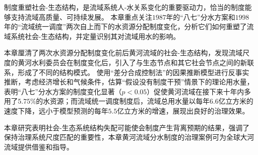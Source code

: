 制度重塑社会-生态结构，是流域系统人-水关系变化的重要驱动力，恰当的制度能够支持流域高质量、可持续发展。
本章重点关注$1987$年的“八七”分水方案和$1998$年的“流域统一调度”两次自上而下的水资源分配制度变化，分析它们如何重塑了流域系统社会-生态结构，并定量识别其对流域用水的影响。

本章厘清了两次水资源分配制度变化前后黄河流域的社会-生态结构，发现流域尺度的黄河水利委员会在制度变化后，引入了与生态节点和其它社会节点之间的新联系，形成了不同的结构模式。
使用“差分合成控制法”的因果推断模型进行反事实推断，考虑经济增长和气候条件，估算“假设没有制度干预”情景下的理论用水量，表明“八七”分水方案的制度变化显著（$p<0.05$）促使黄河流域在接下来十年内多用了$5.75\%$的水资源；而流域统一调度制度后，流域总用水量以每年$6.6$亿立方米的速度下降，远小于模型预测的每年$5.5$亿立方米的增速，展现出良好的治理效果。

本章研究表明社会-生态系统结构失配可能使会制度产生背离预期的结果，强调了保持治理系统尺度匹配的重要性，本章黄河流域分水制度的治理案例可为全球大河流域提供借鉴和指导。
